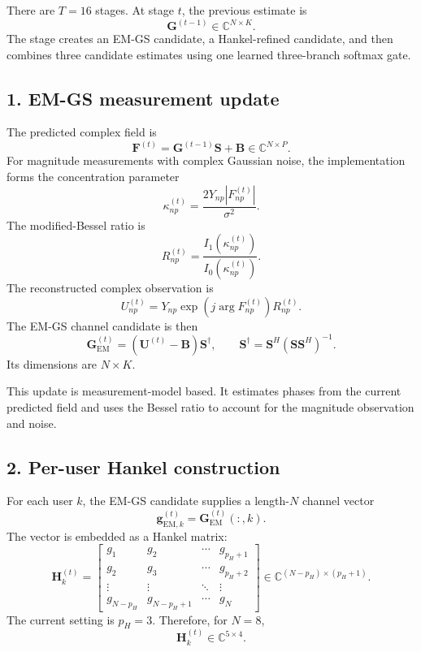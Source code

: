 ﻿\documentclass[11pt,a4paper]{article}
\begin{document}
There are \(T=16\) stages. At stage \(t\), the previous estimate is
\[
\bm{G}^{(t-1)}\in\mathbb{C}^{N\times K}.
\]
The stage creates an EM-GS candidate, a Hankel-refined candidate, and
then combines three candidate estimates using one learned three-branch
softmax gate.

\subsection{1. EM-GS measurement update}

The predicted complex field is
\begin{equation}
\bm{F}^{(t)}
=
\bm{G}^{(t-1)}\bm{S}+\bm{B}
\in\mathbb{C}^{N\times P}.
\end{equation}
For magnitude measurements with complex Gaussian noise, the implementation
forms the concentration parameter
\begin{equation}
\kappa^{(t)}_{np}
=
\frac{2Y_{np}\left|F^{(t)}_{np}\right|}{\sigma^2}.
\end{equation}
The modified-Bessel ratio is
\begin{equation}
R^{(t)}_{np}
=
\frac{I_1\!\left(\kappa^{(t)}_{np}\right)}
     {I_0\!\left(\kappa^{(t)}_{np}\right)}.
\end{equation}
The reconstructed complex observation is
\begin{equation}
U^{(t)}_{np}
=
Y_{np}
\exp\!\left(j\arg F^{(t)}_{np}\right)
R^{(t)}_{np}.
\end{equation}
The EM-GS channel candidate is then
\begin{equation}
\bm{G}_{\mathrm{EM}}^{(t)}
=
\left(\bm{U}^{(t)}-\bm{B}\right)
\bm{S}^{\dagger},
\qquad
\bm{S}^{\dagger}
=
\bm{S}^{H}\left(\bm{S}\bm{S}^{H}\right)^{-1}.
\end{equation}
Its dimensions are \(N\times K\).

This update is measurement-model based. It estimates phases from the
current predicted field and uses the Bessel ratio to account for the
magnitude observation and noise.

\subsection{2. Per-user Hankel construction}

For each user \(k\), the EM-GS candidate supplies a length-\(N\) channel
vector
\[
\bm{g}_{\mathrm{EM},k}^{(t)}
=
\bm{G}_{\mathrm{EM}}^{(t)}(:,k).
\]
The vector is embedded as a Hankel matrix:
\begin{equation}
\bm{H}_{k}^{(t)}
=
\begin{bmatrix}
g_1 & g_2 & \cdots & g_{p_H+1}\\
g_2 & g_3 & \cdots & g_{p_H+2}\\
\vdots & \vdots & \ddots & \vdots\\
g_{N-p_H} & g_{N-p_H+1} & \cdots & g_N
\end{bmatrix}
\in\mathbb{C}^{(N-p_H)\times(p_H+1)}.
\end{equation}
The current setting is \(p_H=3\). Therefore, for \(N=8\),
\[
\bm{H}_{k}^{(t)}\in\mathbb{C}^{5\times4}.
\]
\end{document}
